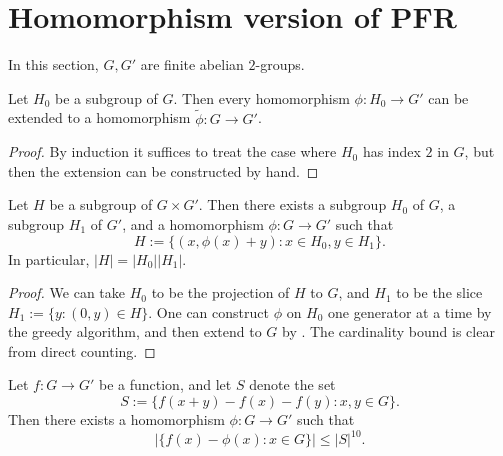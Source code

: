\chapter{Homomorphism version of PFR}

In this section, $G, G'$ are finite abelian $2$-groups.

\begin{lemma}\label{hb-thm}\leanok  Let $H_0$ be a subgroup of $G$.  Then every homomorphism $\phi: H_0 \to G'$ can be extended to a homomorphism $\tilde \phi: G \to G'$.
\end{lemma}

\begin{proof}\leanok  By induction it suffices to treat the case where $H_0$ has index $2$ in $G$, but then the extension can be constructed by hand.
\end{proof}

\begin{lemma}\label{goursat}\leanok  Let $H$ be a subgroup of $G \times G'$.  Then there exists a subgroup $H_0$ of $G$, a subgroup $H_1$ of $G'$, and a homomorphism $\phi: G \to G'$ such that
$$ H := \{ (x, \phi(x) + y): x \in H_0, y \in H_1 \}.$$
In particular, $|H| = |H_0| |H_1|$.
\end{lemma}

\begin{proof}\leanok We can take $H_0$ to be the projection of $H$ to $G$, and $H_1$ to be the slice $H_1 := \{ y: (0,y) \in H \}$.  One can construct $\phi$ on $H_0$ one generator at a time by the greedy algorithm, and then extend to $G$ by .  The cardinality bound is clear from direct counting.
\end{proof}

\begin{theorem}\label{hom-pfr}\leanok  Let $f: G \to G'$ be a function, and let $S$ denote the set
$$ S := \{ f(x+y)-f(x)-f(y): x,y \in G \}.$$
Then there exists a homomorphism $\phi: G \to G'$ such that
$$ |\{ f(x) - \phi(x): x \in G \}| \leq |S|^{10}.$$
\end{theorem}

